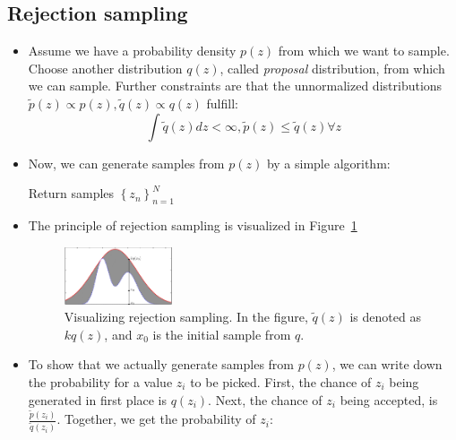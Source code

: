 \subsection{Rejection sampling}
\begin{itemize}
	\item Assume we have a probability density $p(z)$ from which we want to sample. Choose another distribution $q(z)$, called \textit{proposal} distribution, from which we can sample. Further constraints are that the unnormalized distributions $\tilde{p}(z)\propto p(z), \tilde{q}(z)\propto q(z)$ fulfill:
	$$\int \tilde{q}(z)dz < \infty, \tilde{p}(z)\leq \tilde{q}(z) \forall z$$
	\item Now, we can generate samples from $p(z)$ by a simple algorithm:
	\begin{tcolorbox}[colback=white!85!gray,colframe=gray!75!black,title=Pseudocode for rejection sampling]
		\begin{algorithm}[H]
			\SetAlgoLined
			Return samples $\left\{z_n\right\}_{n=1}^{N}$\;
		\end{algorithm}
	\end{tcolorbox}
	\item The principle of rejection sampling is visualized in Figure~\ref{fig:sampling_rejection_sampling}
	\begin{figure}[ht!]
		\centering
		\includegraphics[width=0.3\textwidth]{figures/sampling_rejection_sampling.png}
		\caption{Visualizing rejection sampling. In the figure, $\tilde{q}(z)$ is denoted as $kq(z)$, and $x_0$ is the initial sample from $q$.}
		\label{fig:sampling_rejection_sampling}
	\end{figure}
	\item To show that we actually generate samples from $p(z)$, we can write down the probability for a value $z_i$ to be picked. First, the chance of $z_i$ being generated in first place is $q(z_i)$. Next, the chance of $z_i$ being accepted, is $\frac{\tilde{p}(z_i)}{\tilde{q}(z_i)}$. Together, we get the probability of $z_i$:

\end{itemize}
